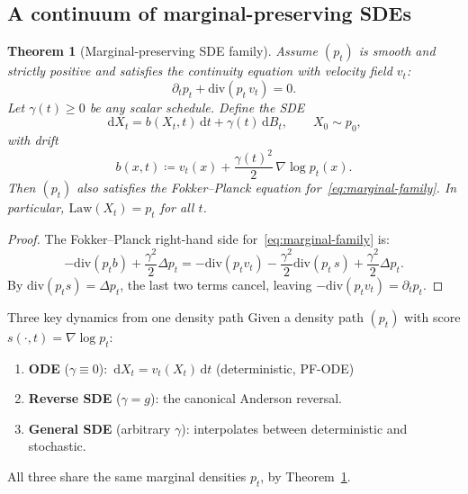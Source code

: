 \documentclass[11pt]{article}
\newcommand{\grad}{\nabla}
\newcommand{\diver}{\mathrm{div}}
\newcommand{\dd}{\,\mathrm{d}}
\newcommand{\law}{\mathrm{Law}}
\newtheorem{theorem}{Theorem}[section]
\theoremstyle{definition}
\theoremstyle{remark}
\begin{document}
\subsection{A continuum of marginal-preserving SDEs}\label{subsec:marginal-family}

\begin{theorem}[Marginal-preserving SDE family]\label{thm:marginal-family}
Assume $(p_t)$ is smooth and strictly positive and satisfies the continuity equation with velocity field $v_t$:
\[
\partial_t p_t + \diver(p_t\,v_t) = 0.
\]
Let $\gamma(t)\ge 0$ be any scalar schedule.
Define the SDE
\begin{equation}\label{eq:marginal-family}
\dd X_t = b(X_t,t)\dd t + \gamma(t)\dd B_t, \qquad X_0 \sim p_0,
\end{equation}
with drift
\begin{equation}\label{eq:marginal-family-drift}
b(x,t) \coloneqq v_t(x) + \frac{\gamma(t)^2}{2}\,\grad\log p_t(x).
\end{equation}
Then $(p_t)$ also satisfies the Fokker--Planck equation for~\eqref{eq:marginal-family}.
In particular, $\law(X_t) = p_t$ for all $t$.
\end{theorem}

\begin{proof}
The Fokker--Planck right-hand side for~\eqref{eq:marginal-family} is:
\[
-\diver(p_t b) + \frac{\gamma^2}{2}\Delta p_t
= -\diver(p_t v_t) - \frac{\gamma^2}{2}\diver(p_t\,s) + \frac{\gamma^2}{2}\Delta p_t.
\]
By $\diver(p_t s) = \Delta p_t$, the last two terms cancel, leaving $-\diver(p_t v_t) = \partial_t p_t$.
\end{proof}

\begin{summarybox}{Three key dynamics from one density path}
Given a density path $(p_t)$ with score $s(\cdot,t) = \grad\log p_t$:
\begin{enumerate}[nosep]
\item \textbf{ODE} ($\gamma\equiv 0$): $\dd X_t = v_t(X_t)\dd t$ \hfill (deterministic, PF-ODE)
\item \textbf{Reverse SDE} ($\gamma = g$): the canonical Anderson reversal.
\item \textbf{General SDE} (arbitrary $\gamma$): interpolates between deterministic and stochastic.
\end{enumerate}
All three share the same marginal densities $p_t$, by Theorem~\ref{thm:marginal-family}.
\end{summarybox}
\end{document}
